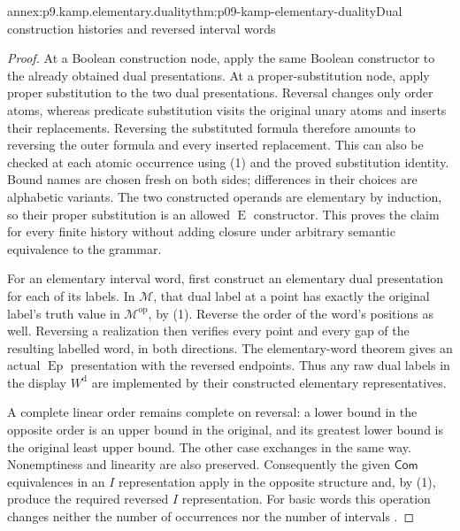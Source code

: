 \begin{annexitem}{annex:p9.kamp.elementary.duality}{thm:p09-kamp-elementary-duality}{Dual construction histories and reversed interval words}
\begin{proof}
At a Boolean construction node, apply the same Boolean constructor to
the already obtained dual presentations. At a proper-substitution node,
apply proper substitution to the two dual presentations. Reversal changes
only order atoms, whereas predicate substitution visits the original unary
atoms and inserts their replacements. Reversing the substituted formula
therefore amounts to reversing the outer formula and every inserted
replacement. This can also be checked at each atomic occurrence using
(1) and the proved substitution identity. Bound names are chosen fresh
on both sides; differences in their choices are alphabetic variants.
The two constructed operands are elementary by induction, so their
proper substitution is an allowed \(\operatorname{E}\) constructor.
This proves the claim for every finite history without adding closure
under arbitrary semantic equivalence to the grammar.

For an elementary interval word, first construct an elementary dual
presentation for each of its labels. In \(\mathcal M\), that
dual label at a point has exactly the original label's truth value
in \(\mathcal M^{\mathrm{op}}\), by (1). Reverse the order
of the word's positions as well. Reversing a realization then verifies
every point and every gap of the resulting labelled word, in both
directions. The elementary-word theorem gives an actual
\(\operatorname{Ep}\) presentation with the reversed endpoints.
Thus any raw dual labels in the display \(W^{\mathrm d}\)
are implemented by their constructed elementary representatives.

A complete linear order remains complete on reversal: a lower bound
in the opposite order is an upper bound in the original, and its
greatest lower bound is the original least upper bound. The other
case exchanges in the same way. Nonemptiness and linearity are also
preserved. Consequently the given \(\mathsf{Com}\) equivalences
in an \(I\) representation apply in the opposite structure and,
by (1), produce the required reversed \(I\) representation.
For basic words this operation changes neither the number of occurrences
nor the number of intervals \cite[ch.~III, pp.~64--68, 92]{Kamp1968}.
\end{proof}
\end{annexitem}

